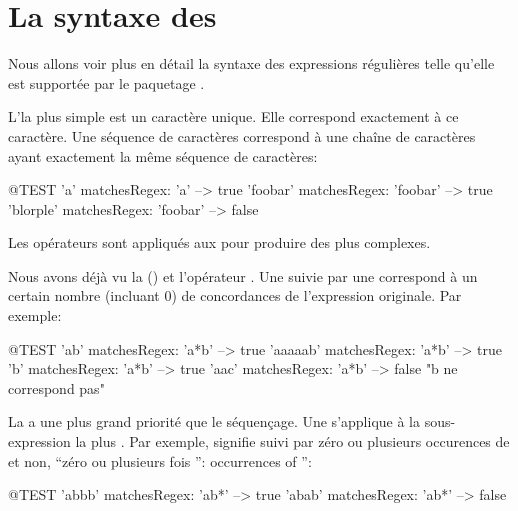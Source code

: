 \documentclass[a4paper,10pt,twoside]{book}
\begin{document}
\section{La syntaxe des \expregs}

Nous allons voir plus en détail la syntaxe des expressions régulières telle qu'elle
est supportée par le paquetage \pkgregex.

L'\expreg la plus simple est un caractère unique. Elle correspond
exactement à ce caractère. Une séquence de caractères correspond à une
chaîne de caractères ayant exactement la même séquence de caractères:
\begin{code}{@TEST}
'a' matchesRegex: 'a'                  --> true
'foobar' matchesRegex: 'foobar'  --> true
'blorple' matchesRegex: 'foobar' --> false
\end{code}

Les opérateurs sont appliqués aux \expregs pour produire des \expregs
plus complexes.

Nous avons déjà vu la \ind{\kleenestar} (\ct{*}) et l'opérateur \ct{+}.
Une \expreg suivie par une \kleenestar correspond à un certain nombre
(incluant $0$) de concordances de l'expression originale. Par exemple:
\begin{code}{@TEST}
'ab' matchesRegex: 'a*b'         --> true
'aaaaab' matchesRegex: 'a*b' --> true
'b' matchesRegex: 'a*b'           --> true
'aac' matchesRegex: 'a*b'	    --> false    "b ne correspond pas"
\end{code}

La \kleenestar a une plus grand priorité que le séquençage. Une
\kleenestar s'applique à la sous-expression la plus 
.
Par exemple,  signifie  suivi par zéro ou plusieurs
occurences de  et non, ``zéro ou plusieurs fois '':
occurrences of '':
\begin{code}{@TEST}
'abbb' matchesRegex: 'ab*' --> true
'abab' matchesRegex: 'ab*' --> false
\end{code}
\end{document}
